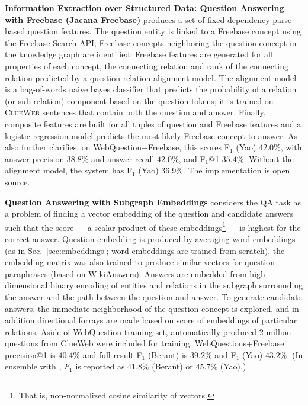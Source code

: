\textbf{Information Extraction over Structured Data: Question Answering with Freebase (Jacana Freebase)} \citep{TreeFreebase2014Yao}
	produces a set of fixed dependency-parse based question features.
	The question entity is linked to a Freebase concept using the Freebase Search API;
	Freebase concepts neighboring the question concept in the knowledge
	graph are identified;
	Freebase features are generated for all
	properties of each concept, the connecting relation and rank
	of the connecting relation predicted by a question-relation
	alignment model.  The alignment model is a bag-of-words
	naive bayes classifier that predicts the probability of a relation
	(or sub-relation) component based on the question tokens;
	it is trained on \textsc{ClueWeb} sentences that contain
	both the question and answer.
	Finally, composite features are built for all tuples of question and Freebase features
	and a logistic regression model predicts the most likely Freebase concept to answer.
	As \citep{FreebaseQA2014Yao} also further clarifies,
	on WebQuestion+Freebase, this scores F$_1$ (Yao) 42.0\%,
	with answer precision $38.8\%$ and answer recall $42.0\%$,
	and F$_1$@1 $35.4\%$.
	Without the alignment model, the system has F$_1$ (Yao) 36.9\%.
	The implementation is open source.

\textbf{Question Answering with Subgraph Embeddings} \citep{Semantic2014Bordes}
	considers the QA task as a problem of finding a vector embedding
	of the question and candidate answers such that the score --- a scalar product
	of these embeddings\footnote{That is, non-normalized cosine similarity of vectors.} ---
	is highest for the correct answer.
	Question embedding is produced by averaging word embeddings
	(as in Sec.~\ref{sec:embeddings}; word embeddings are trained from scratch),
	the embedding matrix was also trained to produce similar
	vectors for question paraphrases (based on WikiAnswers).
	Answers are embedded from high-dimensional binary encoding
	of entities and relations in the subgraph surrounding the answer
	and the path between the question and answer.
	To generate candidate answers, the immediate neighborhood of the question
	concept is explored, and in addition directional forrays are made based
	on score of embeddings of particular relations.
	Aside of WebQuestion training set, automatically produced 2 million
	questions from ClueWeb were included for training.
	WebQuestions+Freebase precision@1 is $40.4\%$ and
	full-result F$_1$ (Berant) is $39.2\%$ and F$_1$ (Yao) $43.2\%$.
	(In ensemble with \cite{SPBerant2014Paraphrase},
	$F_1$ is reported as $41.8\%$ (Berant) or $45.7\%$ (Yao).)

